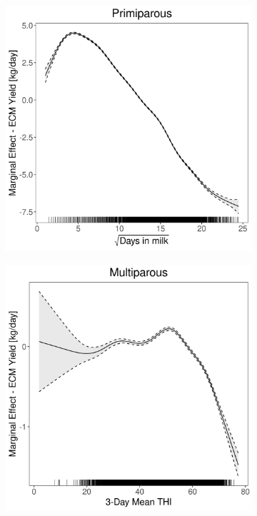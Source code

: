 \begin{figure}[H]
\begin{subfigure}[b]{0.45\textwidth}
    \end{subfigure}
    \hspace{0.05\textwidth} %
    \begin{subfigure}[b]{0.45\textwidth}
        \centering
        \includegraphics[width=\textwidth]{thesis/figures/models/ecm/full/ho_ecm_full/ho_ecm_full_marginal_dim_milk_primi.png}
    \end{subfigure}
    \begin{subfigure}[b]{0.45\textwidth}
        \centering
        \includegraphics[width=\textwidth]{thesis/figures/models/ecm/full/ho_ecm_full/ho_ecm_full_marginal_thi_milk_multi.png}

\end{subfigure}
\end{figure}
